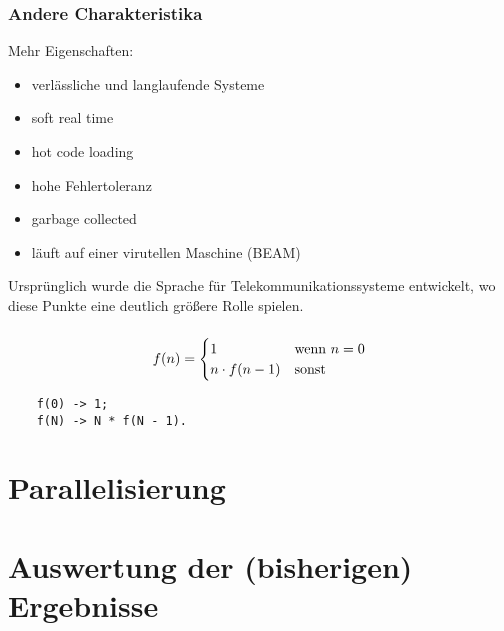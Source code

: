 \documentclass[compress]{beamer}
\begin{document}
\begin{frame}
  \frametitle{Andere Charakteristika}

  Mehr Eigenschaften:

  \begin{itemize}
  \item verlässliche und langlaufende Systeme
  \item soft real time
  \item hot code loading
  \item hohe Fehlertoleranz
  \item garbage collected
  \item läuft auf einer virutellen Maschine (BEAM)
  \end{itemize}

  Ursprünglich wurde die Sprache für Telekommunikationssysteme
  entwickelt, wo diese Punkte eine deutlich größere Rolle spielen.
\end{frame}
\begin{frame}[fragile]
  \frametitle{}
  $$
  f(n) =
  \begin{cases}
    1            \hfill &\textrm{wenn } n = 0 \\
    n \cdot f(n - 1) & \textrm{sonst}
  \end{cases}
  $$
  \vfill

  \begin{lstlisting}
    f(0) -> 1;
    f(N) -> N * f(N - 1).
  \end{lstlisting}
\end{frame}
\section{Parallelisierung}
\label{sec:parallelisierung}

\section{Auswertung der (bisherigen) Ergebnisse}
\label{sec:auswertung}
\end{document}
